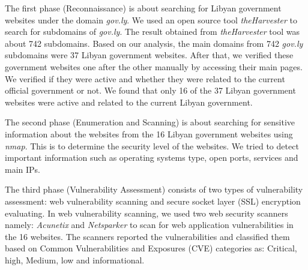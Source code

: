 \documentclass[conference]{IEEEtran}
\begin{document}
%

The first phase (Reconnaissance) is about searching for Libyan
government websites under the domain \emph{gov.ly}. We used an open source tool 
\emph{theHarvester} 
to search for subdomains of \emph{gov.ly}. The result obtained from
\emph{theHarvester} tool was about 742 subdomains. Based on
our analysis, the main domains from 742 \emph{gov.ly} subdomains
were 37 Libyan government websites. After that, we verified these
government websites one after the other manually by accessing their main
pages. We verified if they were active and whether they were related to the current official
government or not. We found that only 16 of the 37 Libyan government
websites were active and related to the current Libyan government.

The second phase (Enumeration and Scanning) is about searching for sensitive information about the websites from the 16 Libyan government websites using \emph{nmap}. This is to determine the security level of the websites. We tried to detect important information such as
operating systems type, open ports, services and main IPs. 

The third phase (Vulnerability Assessment) consists of two types of
vulnerability assessment: web vulnerability scanning and secure socket layer (SSL) encryption evaluating. 
In web vulnerability scanning, we used two web security scanners namely: \emph{Acunetix}
and \emph{Netsparker} to scan for web application vulnerabilities in
the 16 websites. The scanners reported the vulnerabilities and
classified them based on Common Vulnerabilities and Exposures (CVE)
categories as: Critical, high, Medium, low and informational.
\end{document}
